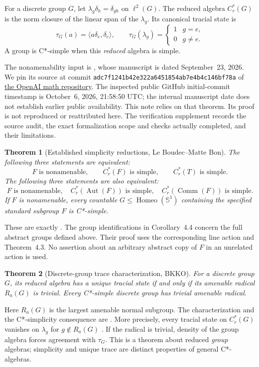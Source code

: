 \documentclass[11pt]{article}
\newtheorem{theorem}{Theorem}
\newcommand{\Cr}{C^*_r}
\newcommand{\Aut}{\operatorname{Aut}}
\newcommand{\Comm}{\operatorname{Comm}}
\newcommand{\Homeo}{\operatorname{Homeo}}
\begin{document}
For a discrete group $G$, let $\lambda_g\delta_h=\delta_{gh}$ on $\ell^2(G)$. The reduced algebra $\Cr(G)$ is the norm closure of the linear span of the $\lambda_g$. Its canonical tracial state is
\[
 \tau_G(a)=\langle a\delta_e,\delta_e\rangle,
 \qquad \tau_G(\lambda_g)=\begin{cases}1&g=e,\\0&g\ne e.\end{cases}
\]
A group is C*-simple when this \emph{reduced} algebra is simple.

The nonamenability input is \cite[main theorem]{OAI}, whose manuscript is dated September~23, 2026. We pin its source at commit
\texttt{adc7f1241b42e322a6451854ab7e4b4c146bf78a} of \href{https://github.com/openai/math}{the OpenAI math repository}. The inspected public GitHub initial-commit timestamp is October~6, 2026, 21:58:50 UTC; the internal manuscript date does not establish earlier public availability. This note relies on that theorem. Its proof is not reproduced or reattributed here. The verification supplement records the source audit, the exact formalization scope and checks actually completed, and their limitations.

\begin{theorem}[Established simplicity reductions, Le Boudec--Matte Bon]\label{thm:reductions}
The following three statements are equivalent:
\[
 F\text{ is nonamenable},\qquad \Cr(F)\text{ is simple},\qquad \Cr(T)\text{ is simple}.
\]
The following three statements are also equivalent:
\[
 F\text{ is nonamenable},\quad \Cr(\Aut(F))\text{ is simple},\quad \Cr(\Comm(F))\text{ is simple}.
\]
If $F$ is nonamenable, every countable $G\leq\Homeo(\mathbb S^1)$ containing the specified standard subgroup $F$ is C*-simple.
\end{theorem}
These are exactly \cite[Corollaries~4.2 and 4.4, Theorem~4.1]{LMB}. The group identifications in Corollary~4.4 concern the full abstract groups defined above. Their proof uses the corresponding line action and Theorem~4.3. No assertion about an arbitrary abstract copy of $F$ in an unrelated action is used.

\begin{theorem}[Discrete-group trace characterization, BKKO]\label{thm:trace}
For a discrete group $G$, its reduced algebra has a unique tracial state if and only if its amenable radical $R_a(G)$ is trivial. Every C*-simple discrete group has trivial amenable radical.
\end{theorem}
Here $R_a(G)$ is the largest amenable normal subgroup. The characterization and the C*-simplicity consequence are \cite[Theorem~1.3 and Corollary~4.3]{BKKO}. More precisely, every tracial state on $\Cr(G)$ vanishes on $\lambda_g$ for $g\notin R_a(G)$ \cite[Theorem~4.1]{BKKO}. If the radical is trivial, density of the group algebra forces agreement with $\tau_G$. This is a theorem about reduced \emph{group} algebras; simplicity and unique trace are distinct properties of general C*-algebras.
\end{document}
